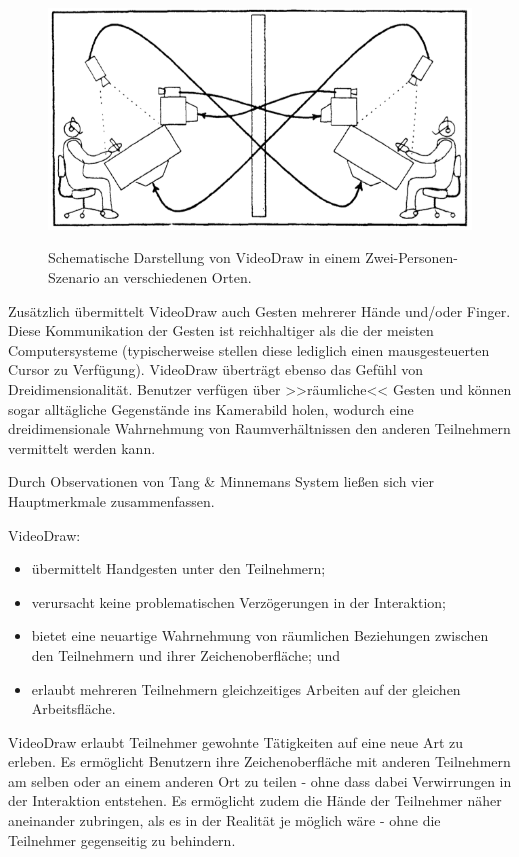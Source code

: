 \begin{figure}[bth]
	{\includegraphics[width=\linewidth]{gfx/tangVideoDraw}}
	\caption[VideoDraw \newline \citep{Tang:1991p28}]{Schematische Darstellung von VideoDraw in einem Zwei-Personen-Szenario an verschiedenen Orten.}
	\label{fig:tangVideoDraw}
\end{figure}

\newpage Zusätzlich übermittelt VideoDraw auch Gesten mehrerer Hände und/oder Finger. Diese Kommunikation der Gesten ist reichhaltiger als die der meisten Computersysteme (typischerweise stellen diese lediglich einen mausgesteuerten Cursor zu Verfügung). VideoDraw überträgt ebenso das Gefühl von Dreidimensionalität.
Benutzer verfügen über >>räumliche<< Gesten und können sogar alltägliche Gegenstände ins Kamerabild holen, wodurch eine dreidimensionale Wahrnehmung von Raumverhältnissen den anderen Teilnehmern vermittelt werden kann.

\medskip Durch Observationen von Tang \& Minnemans System ließen sich vier Hauptmerkmale zusammenfassen.

\medskip VideoDraw:
\begin{itemize}
	\item übermittelt Handgesten unter den Teilnehmern;
	\item verursacht keine problematischen Verzögerungen in der Interaktion;
	\item bietet eine neuartige Wahrnehmung von räumlichen Beziehungen zwischen den Teilnehmern und ihrer Zeichenoberfläche; und
	\item erlaubt mehreren Teilnehmern gleichzeitiges Arbeiten auf der gleichen Arbeitsfläche.
\end{itemize}

VideoDraw erlaubt Teilnehmer gewohnte Tätigkeiten auf eine neue Art zu erleben. Es ermöglicht Benutzern ihre Zeichenoberfläche mit anderen Teilnehmern am selben oder an einem anderen Ort zu teilen - ohne dass dabei Verwirrungen in der Interaktion entstehen. Es ermöglicht zudem die Hände der Teilnehmer näher aneinander zubringen, als es in der Realität je möglich wäre - ohne die Teilnehmer gegenseitig zu behindern. \citep{Tang:1991p28}

